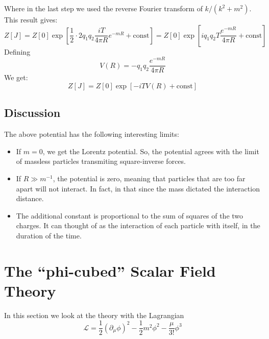 \documentclass{article}
\begin{document}
Where in the last step we used the reverse Fourier transform of $k / (k^2 + m^2)$. This result gives:
\begin{equation}
    Z[J] = Z[0]\exp[\frac{1}{2}\cdot 2 q_1 q_2 \frac{iT}{4\pi R}e^{-mR} + \text{const}] =
    Z[0]\exp[i q_1 q_2 T\frac{e^{-mR}}{4\pi R} + \text{const}]
\end{equation}
Defining
\begin{equation}
    V(R) = -q_1q_2\frac{e^{-mR}}{4\pi R}
\end{equation}
We get:
\begin{equation}
    Z[J] = Z[0]\exp[-iTV(R) + \text{const}]
\end{equation}
\subsection{Discussion}
The above potential has the following interesting limits:
\begin{itemize}
    \item If $m = 0$, we get the Lorentz potential. So, the potential agrees with the limit of massless particles transmiting square-inverse forces.
    \item If $R \gg m^{-1}$, the potential is zero, meaning that particles that are too far apart will not interact. In fact, in that since the mass dictated the interaction distance.
    \item The additional constant is proportional to the sum of squares of the two charges. It can thought of as the interaction of each particle with itself, in the duration of the time.
\end{itemize}

\newpage
\section{The “phi-cubed” Scalar Field Theory}
In this section we look at the theory with the Lagrangian
\begin{equation}
    \mathcal{L} = \frac{1}{2}\left(\partial_\mu \phi\right)^2 - \frac{1}{2}m^2\phi^2 - \frac{\mu}{3!}\phi^3
\end{equation}
\end{document}

